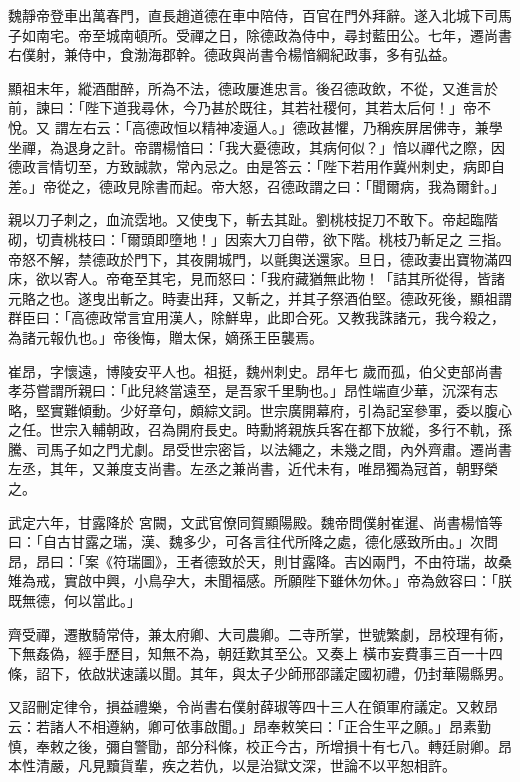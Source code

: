 \begin{pinyinscope}
 魏靜帝登車出萬春門，直長趙道德在車中陪侍，百官在門外拜辭。遂入北城下司馬子如南宅。帝至城南頓所。受禪之日，除德政為侍中，尋封藍田公。七年，遷尚書右僕射，兼侍中，食渤海郡幹。德政與尚書令楊愔綱紀政事，多有弘益。



 顯祖末年，縱酒酣醉，所為不法，德政屢進忠言。後召德政飲，不從，又進言於前，諫曰：「陛下道我尋休，今乃甚於既往，其若社稷何，其若太后何！」帝不悅。又
 謂左右云：「高德政恒以精神凌逼人。」德政甚懼，乃稱疾屏居佛寺，兼學坐禪，為退身之計。帝謂楊愔曰：「我大憂德政，其病何似？」愔以禪代之際，因德政言情切至，方致誠款，常內忌之。由是答云：「陛下若用作冀州刺史，病即自差。」帝從之，德政見除書而起。帝大怒，召德政謂之曰：「聞爾病，我為爾針。」



 親以刀子刺之，血流霑地。又使曳下，斬去其趾。劉桃枝捉刀不敢下。帝起臨階砌，切責桃枝曰：「爾頭即墮地！」因索大刀自帶，欲下階。桃枝乃斬足之
 三指。帝怒不解，禁德政於門下，其夜開城門，以氈輿送還家。旦日，德政妻出寶物滿四床，欲以寄人。帝奄至其宅，見而怒曰：「我府藏猶無此物！「詰其所從得，皆諸元賂之也。遂曳出斬之。時妻出拜，又斬之，并其子祭酒伯堅。德政死後，顯祖謂群臣曰：「高德政常言宜用漢人，除鮮卑，此即合死。又教我誅諸元，我今殺之，為諸元報仇也。」帝後悔，贈太保，嫡孫王臣襲焉。



 崔昂，字懷遠，博陵安平人也。祖挺，魏州刺史。昂年七
 歲而孤，伯父吏部尚書孝芬嘗謂所親曰：「此兒終當遠至，是吾家千里駒也。」昂性端直少華，沉深有志略，堅實難傾動。少好章句，頗綜文詞。世宗廣開幕府，引為記室參軍，委以腹心之任。世宗入輔朝政，召為開府長史。時勳將親族兵客在都下放縱，多行不軌，孫騰、司馬子如之門尤劇。昂受世宗密旨，以法繩之，未幾之間，內外齊肅。遷尚書左丞，其年，又兼度支尚書。左丞之兼尚書，近代未有，唯昂獨為冠首，朝野榮之。



 武定六年，甘露降於
 宮闕，文武官僚同賀顯陽殿。魏帝問僕射崔暹、尚書楊愔等曰：「自古甘露之瑞，漢、魏多少，可各言往代所降之處，德化感致所由。」次問昂，昂曰：「案《符瑞圖》，王者德致於天，則甘露降。吉凶兩門，不由符瑞，故桑雉為戒，實啟中興，小鳥孕大，未聞福感。所願陛下雖休勿休。」帝為斂容曰：「朕既無德，何以當此。」



 齊受禪，遷散騎常侍，兼太府卿、大司農卿。二寺所掌，世號繁劇，昂校理有術，下無姦偽，經手歷目，知無不為，朝廷歎其至公。又奏上
 橫市妄費事三百一十四條，詔下，依啟狀速議以聞。其年，與太子少師邢邵議定國初禮，仍封華陽縣男。



 又詔刪定律令，損益禮樂，令尚書右僕射薛琡等四十三人在領軍府議定。又敕昂云：若諸人不相遵納，卿可依事啟聞。」昂奉敕笑曰：「正合生平之願。」昂素勤慎，奉敕之後，彌自警勖，部分科條，校正今古，所增損十有七八。轉廷尉卿。昂本性清嚴，凡見黷貨輩，疾之若仇，以是治獄文深，世論不以平恕相許。




\end{pinyinscope}
